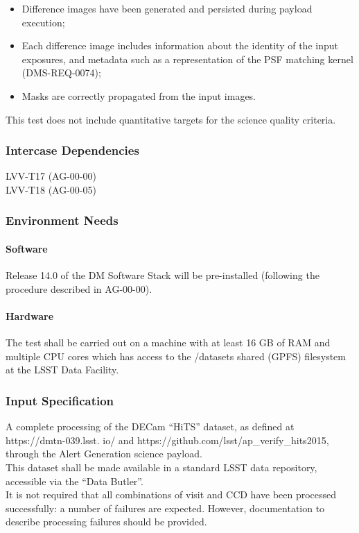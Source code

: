 \begin{itemize}
\tightlist
\item
  Difference images have been generated and persisted during payload
  execution;
\item
  Each difference image includes information about the identity of the
  input exposures, and metadata such as a representation of the PSF
  matching kernel (DMS-REQ-0074);
\item
  Masks are correctly propagated from the input images.
\end{itemize}

This test does not include quantitative targets for the science quality
criteria.



\subsubsection{Intercase Dependencies}
LVV-T17 (AG-00-00)\\
LVV-T18 (AG-00-05)


\subsubsection{Environment Needs}

\paragraph{Software}
Release 14.0 of the DM Software Stack will be pre-installed (following
the procedure described in AG-00-00).


\paragraph{Hardware}
The test shall be carried out on a machine with at least 16 GB of RAM
and multiple CPU cores which has access to the /datasets shared (GPFS)
filesystem at the LSST Data Facility.


\subsubsection{Input Specification}
A complete processing of the DECam ``HiTS'' dataset, as defined at
https://dmtn-039.lsst. io/ and
https://github.com/lsst/ap\_verify\_hits2015, through the Alert
Generation science payload.\\
This dataset shall be made available in a standard LSST data repository,
accessible via the ``Data Butler''.\\
It is not required that all combinations of visit and CCD have been
processed successfully: a number of failures are expected. However,
documentation to describe processing failures should be provided.


